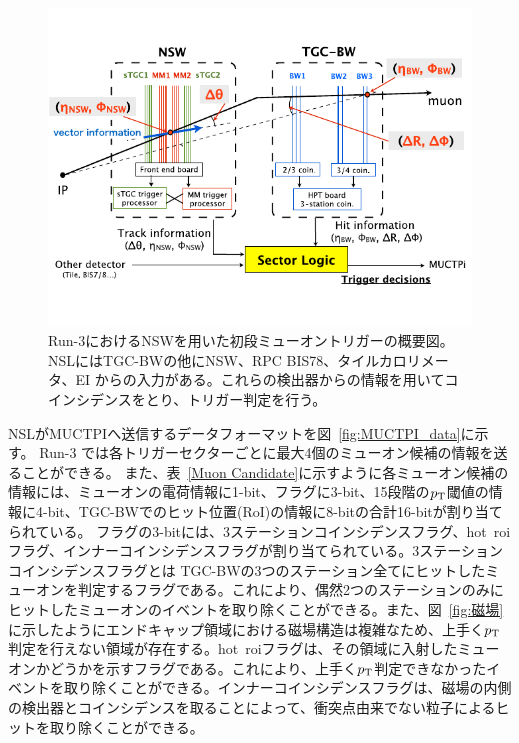 \begin{figure}[tb]
  \centering
  \includegraphics[clip, width=14cm]{fig/2/NSW_innercoin.pdf}
  \caption{Run-3におけるNSWを用いた初段ミューオントリガーの概要図\cite{article:phase1}。NSLにはTGC-BWの他にNSW、RPC BIS78、タイルカロリメータ、EI からの入力がある。これらの検出器からの情報を用いてコインシデンスをとり、トリガー判定を行う。}
  \label{fig:NSW_inner}
\end{figure}

NSLがMUCTPIへ送信するデータフォーマットを図~\ref{fig:MUCTPI_data}に示す。
Run-3 では各トリガーセクターごとに最大4個のミューオン候補の情報を送ることができる。
また、表~\ref{Muon Candidate}に示すように各ミューオン候補の情報には、ミューオンの電荷情報に1-bit、フラグに3-bit、15段階の$p_{\rm{T}}$閾値の情報に4-bit、TGC-BWでのヒット位置(RoI)の情報に8-bitの合計16-bitが割り当てられている。
フラグの3-bitには、3ステーションコインシデンスフラグ、hot~roiフラグ、インナーコインシデンスフラグが割り当てられている。3ステーションコインシデンスフラグとは TGC-BWの3つのステーション全てにヒットしたミューオンを判定するフラグである。これにより、偶然2つのステーションのみにヒットしたミューオンのイベントを取り除くことができる。また、図~\ref{fig:磁場}に示したようにエンドキャップ領域における磁場構造は複雑なため、上手く$p_{\rm{T}}$判定を行えない領域が存在する。hot~roiフラグは、その領域に入射したミューオンかどうかを示すフラグである。これにより、上手く$p_{\rm{T}}$判定できなかったイベントを取り除くことができる。インナーコインシデンスフラグは、磁場の内側の検出器とコインシデンスを取ることによって、衝突点由来でない粒子によるヒットを取り除くことができる。

